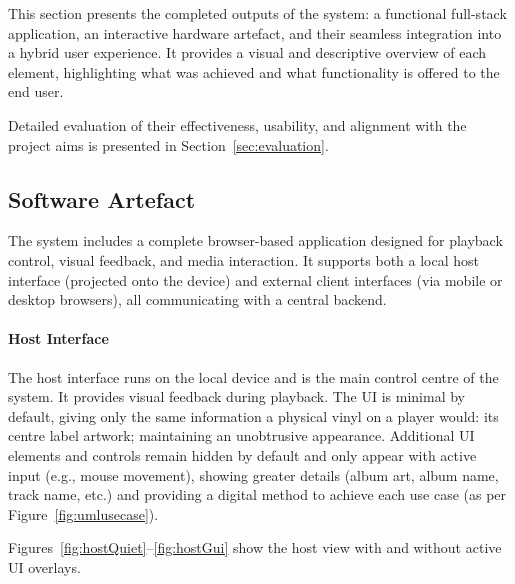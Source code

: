         This section presents the completed outputs of the system: a functional full-stack application, an interactive hardware artefact, and their seamless integration into a hybrid user experience. It provides a visual and descriptive overview of each element, highlighting what was achieved and what functionality is offered to the end user.
        
        Detailed evaluation of their effectiveness, usability, and alignment with the project aims is presented in Section~\ref{sec:evaluation}.
        
        \subsection{Software Artefact}
    
            The system includes a complete browser-based application designed for playback control, visual feedback, and media interaction. It supports both a local host interface (projected onto the device) and external client interfaces (via mobile or desktop browsers), all communicating with a central backend.
    
            \paragraph{Host Interface}
    
            The host interface runs on the local device and is the main control centre of the system. It provides visual feedback during playback. The UI is minimal by default, giving only the same information a physical vinyl on a player would: its centre label artwork; maintaining an unobtrusive appearance. Additional UI elements and controls remain hidden by default and only appear with active input (e.g., mouse movement), showing greater details (album art, album name, track name, etc.) and providing a digital method to achieve each use case (as per Figure~\ref{fig:umlusecase}).
    
            Figures~\ref{fig:hostQuiet}–\ref{fig:hostGui} show the host view with and without active UI overlays.
    

